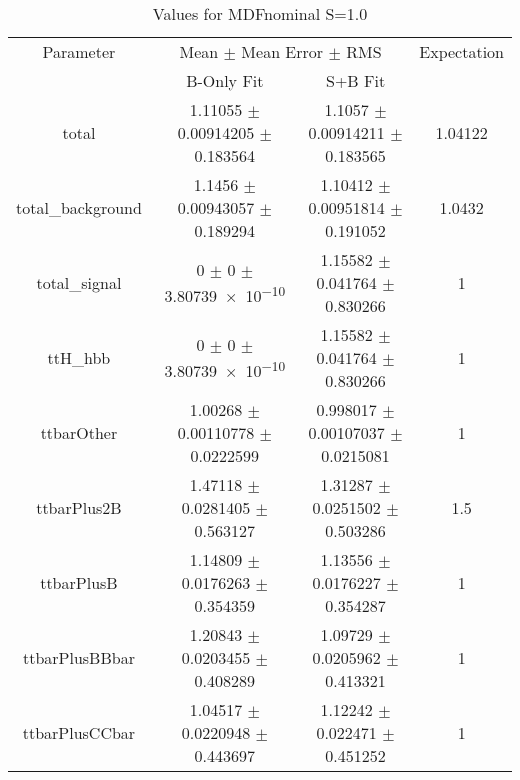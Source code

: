 \begin{table}
\centering
\caption{Values for MDFnominal S=1.0}
\begin{tabular}{cccc}
\toprule
Parameter & \multicolumn{2}{c}{Mean $\pm$ Mean Error $\pm$ RMS} & Expectation\\
 & B-Only Fit & S+B Fit & \\
\midrule
total & \num{1.11055} $\pm$ \num{0.00914205} $\pm$ \num{0.183564} & \num{1.1057} $\pm$ \num{0.00914211} $\pm$ \num{0.183565} & \num{1.04122}\\
total\_background & \num{1.1456} $\pm$ \num{0.00943057} $\pm$ \num{0.189294} & \num{1.10412} $\pm$ \num{0.00951814} $\pm$ \num{0.191052} & \num{1.0432}\\
total\_signal & \num{0} $\pm$ \num{0} $\pm$ \num{3.80739e-10} & \num{1.15582} $\pm$ \num{0.041764} $\pm$ \num{0.830266} & \num{1}\\
ttH\_hbb & \num{0} $\pm$ \num{0} $\pm$ \num{3.80739e-10} & \num{1.15582} $\pm$ \num{0.041764} $\pm$ \num{0.830266} & \num{1}\\
ttbarOther & \num{1.00268} $\pm$ \num{0.00110778} $\pm$ \num{0.0222599} & \num{0.998017} $\pm$ \num{0.00107037} $\pm$ \num{0.0215081} & \num{1}\\
ttbarPlus2B & \num{1.47118} $\pm$ \num{0.0281405} $\pm$ \num{0.563127} & \num{1.31287} $\pm$ \num{0.0251502} $\pm$ \num{0.503286} & \num{1.5}\\
ttbarPlusB & \num{1.14809} $\pm$ \num{0.0176263} $\pm$ \num{0.354359} & \num{1.13556} $\pm$ \num{0.0176227} $\pm$ \num{0.354287} & \num{1}\\
ttbarPlusBBbar & \num{1.20843} $\pm$ \num{0.0203455} $\pm$ \num{0.408289} & \num{1.09729} $\pm$ \num{0.0205962} $\pm$ \num{0.413321} & \num{1}\\
ttbarPlusCCbar & \num{1.04517} $\pm$ \num{0.0220948} $\pm$ \num{0.443697} & \num{1.12242} $\pm$ \num{0.022471} $\pm$ \num{0.451252} & \num{1}\\
\bottomrule
\end{tabular}
\end{table}
